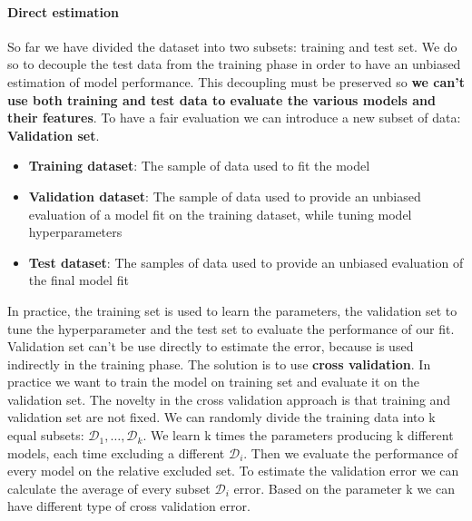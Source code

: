 \documentclass[main.tex]{subfiles}
\begin{document}
\paragraph{Direct estimation}
So far we have divided the dataset into two subsets: training and test set. We do so to decouple the test data from the training phase in order to have an unbiased estimation of model performance. This decoupling must be preserved so \textbf{we can't use both training and test data to evaluate the various models and their features}. To have a fair evaluation we can introduce a new subset of data: \textbf{Validation set}.
\begin{itemize}
    \item \textbf{Training dataset}: The sample of data used to fit the model
    \item \textbf{Validation dataset}: The sample of data used to provide an unbiased evaluation of a model fit on the training dataset, while tuning model hyperparameters\footnotemark
    \item \textbf{Test dataset}: The samples of data used to provide an unbiased evaluation of the final model fit
\end{itemize}
In practice, the training set is used to learn the parameters, the validation set to tune the hyperparameter and the test set to evaluate the performance of our fit.
Validation set can't be use directly to estimate the error, because is used indirectly in the training phase. The solution is to use \textbf{cross validation}.
In practice we want to train the model on training set and evaluate it on the validation set. The novelty in the cross validation approach is that training and validation set are not fixed\footnotemark.
We can randomly divide the training data into k equal subsets: $\mathcal{D}_1, \dots, \mathcal{D}_k$. We learn k times the parameters producing k different models, each time excluding a different $\mathcal{D}_i$. Then we evaluate the performance of every model on the relative excluded set. To estimate the validation error we can calculate the average of every subset $\mathcal{D}_i$ error. Based on the parameter k we can have different type of cross validation error.
\end{document}
